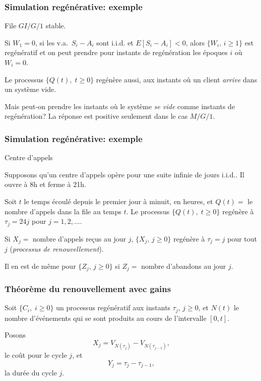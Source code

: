 \documentclass[t,usepdftitle=false]{beamer}
\def\iid{i.i.d.}
\begin{document}
\begin{frame}
\frametitle{Simulation regénérative: exemple}

File $GI/G/1$ stable.

\mbox{}

Si $W_1=0$, si les v.a.\ $S_i-A_i$ sont \iid{} et  $E[S_i - A_i] < 0$, alors
$\{{W_i},\, i\ge 1\}$ est regénératif et on peut prendre pour instants 
de regénération les époques $i$ où ${W_i=0}$.

\mbox{}

Le processus $\{{Q(t)},\; t\ge 0\}$ regénère aussi, aux instants
où un client \emph{arrive} dans un système vide.

\mbox{}

Mais peut-on prendre les instants où le système \emph{se vide} comme instants
de regénération? La réponse est positive seulement dans le cas $M/G/1$.

\end{frame}

\begin{frame}
\frametitle{Simulation regénérative: exemple}

Centre d'appels

\mbox{}

Supposons qu'un centre d'appels opère pour une suite infinie de jours \iid.
Il ouvre à 8h et ferme à 21h.

\mbox{}

Soit ${t}$ le temps écoulé depuis le premier jour à minuit,
en heures, et ${Q(t)} =$ le nombre d'appels dans la file au temps $t$.
Le processus $\{Q(t),\; t\ge 0\}$ regénère à 
${\tau_j} = 24j$ pour $j=1,2,\dots$.

\mbox{}

Si ${X_j}=$ nombre d'appels reçus au jour $j$,
$\{X_j,\, j\ge 0\}$ regénère à ${\tau_j} = j$ pour tout $j$ 
(\emph{processus de renouvellement}).

\mbox{}

Il en est de même pour $\{Z_j,\, j\ge 0\}$ si 
${Z_j}=$ nombre d'abandons au jour $j$.

\end{frame}

\begin{frame}
\frametitle{Théorème du renouvellement avec gains}

Soit $\{{C_i},\;i\ge 0\}$ un processus regénératif aux instants 
${\tau_j}$, $j\ge 0$, et $N(t)$ le nombre d'événements qui se sont produits au cours de l'intervalle $[0,t]$.

\mbox{}

Posons 
\[
  {X_j} = V_{N(\tau_j)}-V_{N(\tau_{j-1})},
\]
le coût pour le cycle $j$, et
\[
  {Y_j} =  \tau_{j} - \tau_{j-1},
\]
la durée du cycle $j$.

\end{frame}
\end{document}
